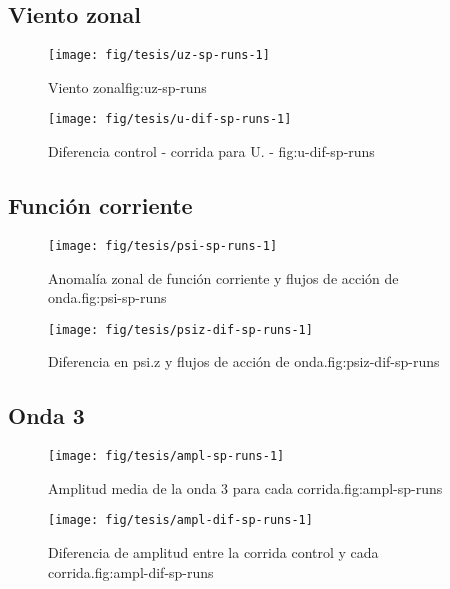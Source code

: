 \documentclass[spanish,a4paper]{book}
\begin{document}
\subsection{Viento zonal}\label{viento-zonal-2}

\begin{figure}

{\centering \texttt{[image: fig/tesis/uz-sp-runs-1]} 

}

\caption{Viento zonal{fig:uz-sp-runs}}\label{fig:uz-sp-runs}
\end{figure}

\begin{figure}
\texttt{[image: fig/tesis/u-dif-sp-runs-1]} \caption{Diferencia control - corrida para U. - fig:u-dif-sp-runs}\label{fig:u-dif-sp-runs}
\end{figure}

\subsection{Función corriente}\label{funcion-corriente-3}

\begin{figure}

{\centering \texttt{[image: fig/tesis/psi-sp-runs-1]} 

}

\caption{Anomalía zonal de función corriente y flujos de acción de onda.{fig:psi-sp-runs}}\label{fig:psi-sp-runs}
\end{figure}

\begin{figure}
\texttt{[image: fig/tesis/psiz-dif-sp-runs-1]} \caption{Diferencia en psi.z y flujos de acción de onda.{fig:psiz-dif-sp-runs}}\label{fig:psiz-dif-sp-runs}
\end{figure}

\subsection{Onda 3}\label{onda-3-2}

\begin{figure}
\texttt{[image: fig/tesis/ampl-sp-runs-1]} \caption{Amplitud media de la onda 3 para cada corrida.{fig:ampl-sp-runs}}\label{fig:ampl-sp-runs}
\end{figure}

\begin{figure}
\texttt{[image: fig/tesis/ampl-dif-sp-runs-1]} \caption{Diferencia de amplitud entre la corrida control y cada corrida.{fig:ampl-dif-sp-runs}}\label{fig:ampl-dif-sp-runs}
\end{figure}
\end{document}
